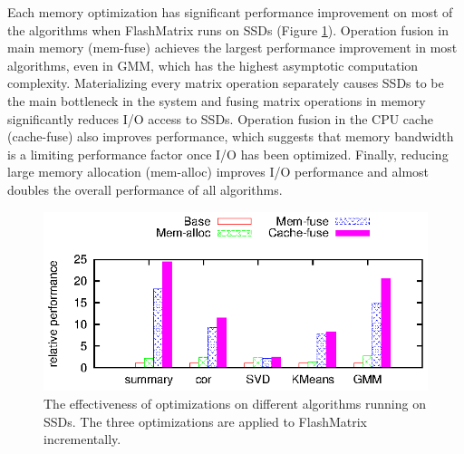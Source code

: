 Each memory optimization has significant performance improvement on most of
the algorithms when FlashMatrix runs on SSDs (Figure \ref{perf:em_opts}).
Operation fusion in main memory (mem-fuse) achieves
the largest performance improvement in most algorithms, even in GMM,
which has the highest asymptotic computation complexity. 
Materializing every matrix operation
separately causes SSDs to be the main bottleneck in the system and
fusing matrix operations in memory significantly reduces I/O access to SSDs.
Operation fusion in the CPU cache (cache-fuse) also improves performance,
which suggests that memory bandwidth is a limiting performance factor once 
I/O has been optimized.
Finally, reducing large memory allocation (mem-alloc) improves I/O performance and almost doubles
the overall performance of all algorithms.

\begin{figure}
	\begin{center}
		\footnotesize
		\includegraphics{FlashMatrix_figs/opts-EM.eps}
		\vspace{-10pt}
		\caption{The effectiveness of optimizations on different algorithms
		running on SSDs. The three optimizations are applied to FlashMatrix
		incrementally.}
		\label{perf:em_opts}
	\end{center}
  \vspace{-15pt}
\end{figure}
